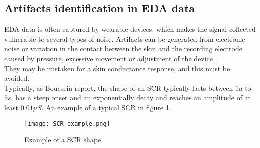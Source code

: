 \subsection{Artifacts identification in EDA data}
EDA data is often captured by wearable devices, which makes the signal collected vulnerable to several types of noise. Artifacts can be generated from electronic noise or variation in the contact between the skin and the recording electrode caused by pressure, excessive movement or adjustment of the device \cite{taylor2015automatic}.
\\
They may be mistaken for a skin conductance response, and this must be avoided.
\\ \indent
Typically, as Boucsein \cite{boucsein2012electrodermal} report, the shape of an SCR typically lasts between $1a$ to $5s$, has a steep onset and an exponentially decay and reaches an amplitude of at least $0.01 \mu S$. An example of a typical SCR in figure \ref{fig:SCR_example}.
\begin{figure}[h]
    \centering
    \texttt{[image: SCR\_example.png]} 
	\caption{Example of a SCR shape}
    \label{fig:SCR_example}
\end{figure}
